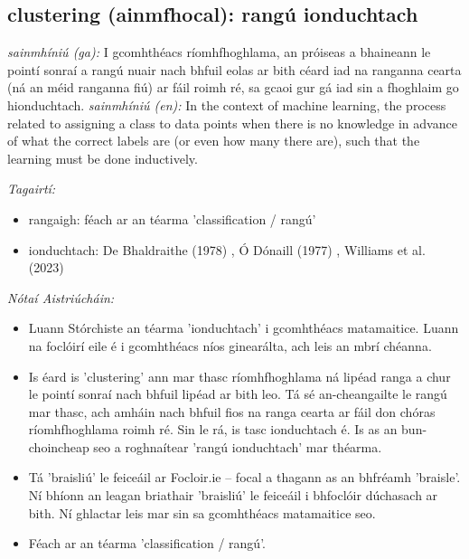 \documentclass{article}
\begin{document}
\subsection*{clustering (ainmfhocal): rangú ionduchtach} 
 \noindent \textit{sainmhíniú (ga):} I gcomhthéacs ríomhfhoghlama, an próiseas a bhaineann le pointí sonraí a rangú nuair nach bhfuil eolas ar bith céard iad na ranganna cearta (ná an méid ranganna fiú) ar fáil roimh ré, sa gcaoi gur gá iad sin a fhoghlaim go hionduchtach.
\newline\newline
 \noindent \textit{sainmhíniú (en):} In the context of machine learning, the process related to assigning a class to data points when there is no knowledge in advance of what the correct labels are (or even how many there are), such that the learning must be done inductively.
\newline

 \noindent \textit{Tagairtí:}
\begin{itemize}
	\item rangaigh: féach ar an téarma 'classification / rangú'
	\item ionduchtach: De Bhaldraithe (1978) \cite{de-bhaldraithe}, Ó Dónaill (1977) \cite{odonaill}, Williams et al. (2023) \cite{storchiste}
\end{itemize}

 \noindent \textit{Nótaí Aistriúcháin:}
\begin{itemize}
	\item Luann Stórchiste an téarma 'ionduchtach' i gcomhthéacs matamaitice. Luann na foclóirí eile é i gcomhthéacs níos ginearálta, ach leis an mbrí chéanna.
	\item Is éard is 'clustering' ann mar thasc ríomhfhoghlama ná lipéad ranga a chur le pointí sonraí nach bhfuil lipéad ar bith leo. Tá sé an-cheangailte le rangú mar thasc, ach amháin nach bhfuil fios na ranga cearta ar fáil don chóras ríomhfhoghlama roimh ré. Sin le rá, is tasc ionduchtach é. Is as an bun-choincheap seo a roghnaítear 'rangú ionduchtach' mar théarma.
	\item Tá 'braisliú' le feiceáil ar Focloir.ie -- focal a thagann as an bhfréamh 'braisle'. Ní bhíonn an leagan briathair 'braisliú' le feiceáil i bhfoclóir dúchasach ar bith. Ní ghlactar leis mar sin sa gcomhthéacs matamaitice seo.
	\item Féach ar an téarma 'classification / rangú'.
\end{itemize}
\end{document}
